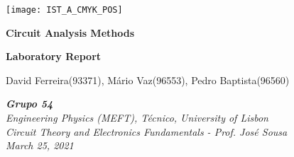 
\thispagestyle {empty}

\texttt{[image: IST\_A\_CMYK\_POS]}

\begin{center}
%
\vspace{1.0cm}
\begin{center}\Large\textbf{Circuit Analysis Methods}\end{center}
\begin{center}\large\textbf{Laboratory Report}\end{center}

\begin{center} David Ferreira(93371), Mário Vaz(96553), Pedro Baptista(96560)\end{center}

\begin{center} \textit {\textbf{Grupo 54} \\Engineering Physics (MEFT), Técnico, University of Lisbon\\ Circuit Theory and Electronics Fundamentals - \small Prof. José Sousa\\March 25, 2021}\end{center}
%
\end{center}

